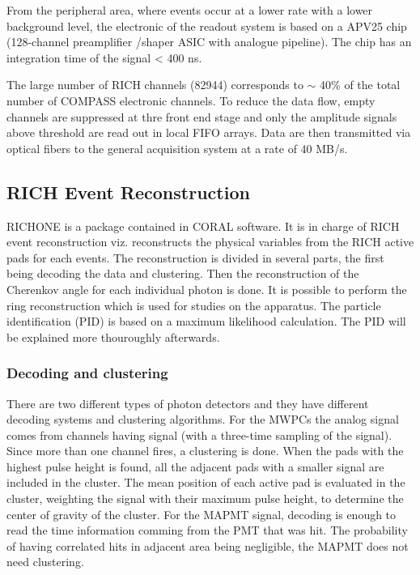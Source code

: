 From the peripheral area, where events occur at a lower rate with a lower background level, the electronic of the readout system is based on a APV25 chip (128-channel preamplifier /shaper ASIC with analogue pipeline)\cite{}. The chip has an integration time of the signal < 400 ns.

The large number of RICH channels (82944) corresponds to $\sim$ 40\% of the total number of COMPASS electronic channels. To reduce the data flow, empty channels are suppressed at thre front end stage and only the amplitude signals above threshold are read out in local FIFO arrays. Data are then transmitted via optical fibers to the general acquisition system at a rate of 40 MB/s.

\subsection{RICH Event Reconstruction}

RICHONE is a package contained in CORAL software. It is in charge of RICH event reconstruction viz. reconstructs the physical variables from the RICH active pads for each events. The reconstruction is divided in several parts, the first being decoding the data and clustering. Then the reconstruction of the Cherenkov angle for each individual photon is done. It is possible to perform the ring reconstruction which is used for studies on the apparatus. The particle identification (PID) is based on a maximum likelihood calculation. The PID will be explained more thouroughly afterwards.

\subsubsection*{Decoding and clustering}

There are two different types of photon detectors and they have different decoding systems and clustering algorithms. For the MWPCs the analog signal comes from channels having signal (with a three-time sampling of the signal)\cite{}. Since more than one channel fires, a clustering is done. When the pads with the highest pulse height is found, all the adjacent pads with a smaller signal are included in the cluster\cite{}. The mean position of each active pad is evaluated in the cluster, weighting the signal with their maximum pulse height, to determine the center of gravity of the cluster. For the MAPMT signal, decoding is enough to read the time information comming from the PMT that was hit. The probability of having correlated hits in adjacent area being negligible, the MAPMT does not need clustering\cite{}.

